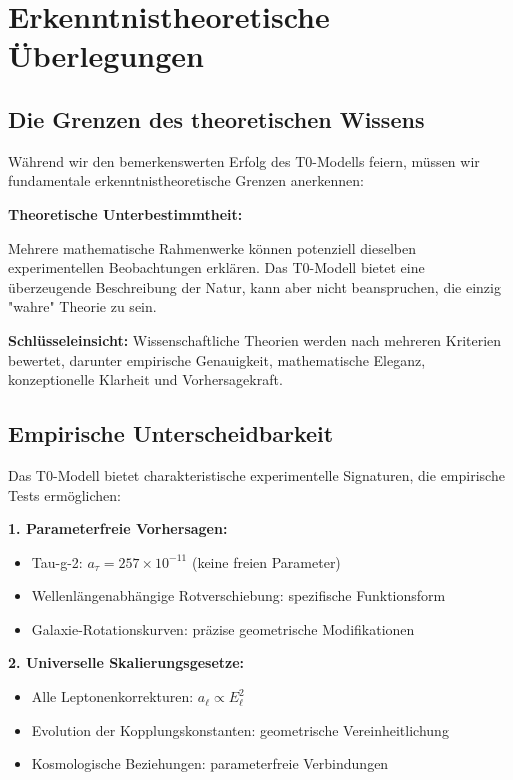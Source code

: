 \documentclass[12pt,a4paper]{report}
\begin{document}
	\section{Erkenntnistheoretische Überlegungen}
	\label{sec:epistemological_considerations}
	
	\subsection{Die Grenzen des theoretischen Wissens}
	\label{subsec:limits_theoretical_knowledge}
	
	Während wir den bemerkenswerten Erfolg des T0-Modells feiern, müssen wir fundamentale erkenntnistheoretische Grenzen anerkennen:
	
	\begin{tcolorbox}[colback=yellow!5!white,colframe=orange!75!black,title=Erkenntnistheoretische Demut]
		\textbf{Theoretische Unterbestimmtheit:}
		
		Mehrere mathematische Rahmenwerke können potenziell dieselben experimentellen Beobachtungen erklären. Das T0-Modell bietet eine überzeugende Beschreibung der Natur, kann aber nicht beanspruchen, die einzig "wahre" Theorie zu sein.
		
		\textbf{Schlüsseleinsicht:} Wissenschaftliche Theorien werden nach mehreren Kriterien bewertet, darunter empirische Genauigkeit, mathematische Eleganz, konzeptionelle Klarheit und Vorhersagekraft.
	\end{tcolorbox}
	
	\subsection{Empirische Unterscheidbarkeit}
	\label{subsec:empirical_distinguishability}
	
	Das T0-Modell bietet charakteristische experimentelle Signaturen, die empirische Tests ermöglichen:
	
	\textbf{1. Parameterfreie Vorhersagen:}
	\begin{itemize}
		\item Tau-g-2: $a_\tau = 257 \times 10^{-11}$ (keine freien Parameter)
		\item Wellenlängenabhängige Rotverschiebung: spezifische Funktionsform
		\item Galaxie-Rotationskurven: präzise geometrische Modifikationen
	\end{itemize}
	
	\textbf{2. Universelle Skalierungsgesetze:}
	\begin{itemize}
		\item Alle Leptonenkorrekturen: $a_\ell \propto E_\ell^2$
		\item Evolution der Kopplungskonstanten: geometrische Vereinheitlichung
		\item Kosmologische Beziehungen: parameterfreie Verbindungen
	\end{itemize}
	
\end{document}
